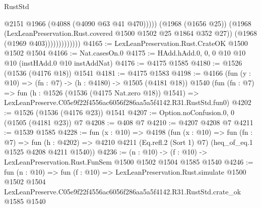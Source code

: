 \begin{lexlean}{RustStd}
\begin{coremodule}
                                @2151
                                @1966
                                (@4088 (@4090 @63 @41 @470)))))
                          (@1968 (@1656 @25))
                          (@1968 (LexLeanPreservation.Rust.covered @1500 @1502 @25 @1864 @352 @27))
                          (@1968 (@1969 @403)))))))))))))
@4165 := LexLeanPreservation.Rust.CrateOK @1500 @1502 @1504
@4166 := Nat.casesOn.{0}
@4175 := HAdd.hAdd.{0, 0, 0} @10 @10 @10 (instHAdd.{0} @10 instAddNat)
@4176 := @4175 @1585
@4180 := @1526 (@1536 (@4176 @18)) @1541
@4181 := @4175 @1583
@4198 := @4166
    (fun (y : @10) => (fn : @7) -> (h : @4180) -> @1505 (@4181 @18))
    @1540
    (fun (fn : @7) =>
    fun (h : @1526 (@1536 (@4175 Nat.zero @18)) @1541) =>
    LexLeanPreserve.C05e9f22f4556ac6056f286aa5a5f4142.R31.RustStd.fun0)
@4202 := @1526 (@1536 (@4176 @23)) @1541
@4207 := Option.noConfusion.{0, 0} (@1505 (@4181 @23)) @7
@4208 := @408 @7
@4210 := @4207 @4208 @7
@4211 := @1539 @1585
@4228 := fun (x : @10) =>
  @4198
    (fun (x : @10) =>
    fun (fn : @7) =>
    fun (h : @4202) =>
    @4210 @4211 (Eq.refl.{2} (Sort 1) @7) (heq_of_eq.{1} @1525 @4208 @4211 @1540))
@4236 := (n : @10) -> (f : @10) -> LexLeanPreservation.Rust.FunSem @1500 @1502 @1504 @1585 @1540
@4246 := fun (n : @10) =>
  fun (f : @10) =>
  LexLeanPreservation.Rust.simulate
    @1500
    @1502
    @1504
    LexLeanPreserve.C05e9f22f4556ac6056f286aa5a5f4142.R31.RustStd.crate_ok
    @1585
    @1540
\end{coremodule}
\end{lexlean}
